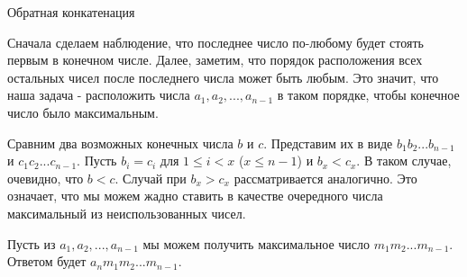 \begin{tutorial}{Обратная конкатенация}

Сначала сделаем наблюдение, что последнее число по-любому будет стоять первым в конечном числе. Далее, заметим, что порядок расположения всех остальных чисел после последнего числа может быть любым. Это значит, что наша задача - расположить числа $a_1, a_2, ..., a_{n-1}$ в таком порядке, чтобы конечное число было максимальным.

Сравним два возможных конечных числа $b$ и $c$. Представим их в виде $b_1b_2...b_{n - 1}$ и $c_1c_2...c_{n - 1}$. Пусть $b_i = c_i$ для $1 \leq i < x$ ($x \leq n - 1$) и $b_x < c_x$. В таком случае, очевидно, что $b < c$. Случай при $b_x > c_x$ рассматривается аналогично. Это означает, что мы можем жадно ставить в качестве очередного числа максимальный из неиспользованных чисел.

Пусть из $a_1, a_2, ..., a_{n-1}$ мы можем получить максимальное число $m_1m_2...m_{n-1}$. Ответом будет $a_nm_1m_2...m_{n-1}$.

\end{tutorial}
